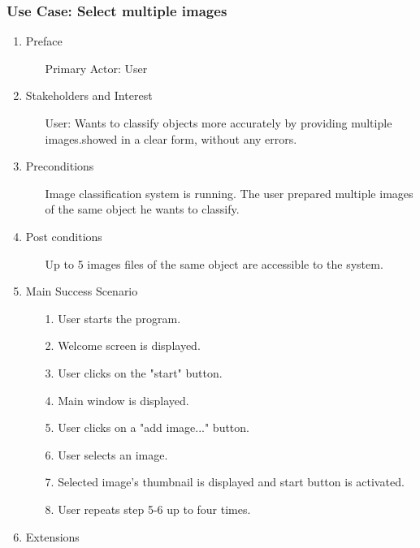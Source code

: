 \documentclass[parskip=full]{scrartcl}
\begin{document}
\pagebreak



\subsubsection {Use Case: Select multiple images}

\begin{enumerate}
	\item Preface
	\begin{itemize} [nosep]
		\item[] Primary Actor: User
	\end{itemize}
	\item Stakeholders and Interest
	\begin{itemize} [nosep]
		\item[] User: Wants to classify objects more accurately by providing multiple images.showed in a clear form, without any errors.
	\end{itemize}
	\item Preconditions
	\begin{itemize} [nosep]
		\item[] Image classification system is running. The user prepared multiple images of the same object he wants to classify.
	\end{itemize}
	\item Post conditions
	\begin{itemize} [nosep]
		\item[] Up to 5 images files of the same object are accessible to the system.
	\end{itemize}
	\item Main Success Scenario
	\begin{itemize} [nosep]
		\item[1.] User starts the program.
		\item[2.] Welcome screen is displayed.
		\item[3.] User clicks on the "start" button.
		\item[4.] Main window is displayed.
		\item[5.] User clicks on a "add image..." button.
		\item[6.] User selects an image.
		\item[7.] Selected image's thumbnail is displayed and start button is activated.
		\item[8.] User repeats step 5-6 up to four times.
	\end{itemize}
	\item Extensions

\end{enumerate}
\end{document}
